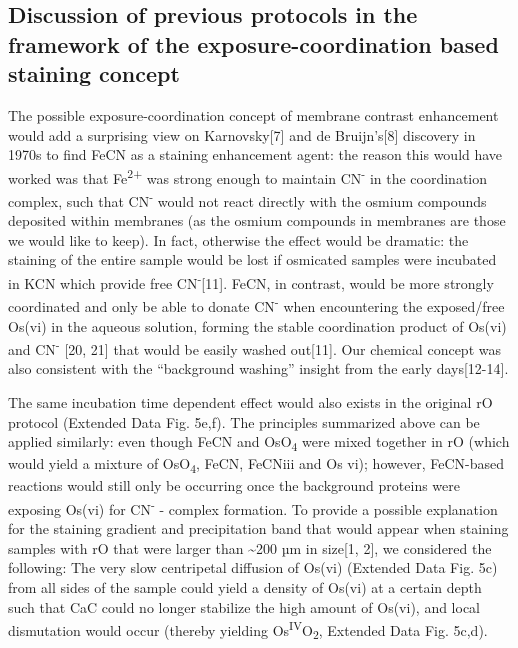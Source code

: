 \documentclass{article}
\begin{document}
\subsection*{Discussion of previous protocols in the framework of the exposure-coordination based staining concept}


The possible exposure-coordination concept of membrane contrast enhancement would add a surprising view on Karnovsky[7] and de Bruijn’s[8] discovery in 1970s to find FeCN as a staining enhancement agent: the reason this would have worked was that Fe\textsuperscript{2+} was strong enough to maintain CN\textsuperscript{-} in the coordination complex, such that CN\textsuperscript{-} would not react directly with the osmium compounds deposited within membranes (as the osmium compounds in membranes are those we would like to keep). In fact, otherwise the effect would be dramatic: the staining of the entire sample would be lost if osmicated samples were incubated in KCN which provide free CN\textsuperscript{-}[11]. FeCN, in contrast, would be more strongly coordinated and only be able to donate CN\textsuperscript{-} when encountering the exposed/free Os(vi) in the aqueous solution, forming the stable coordination product of Os(vi) and CN\textsuperscript{- } [20, 21] that would be easily washed out[11]. Our chemical concept was also consistent with the “background washing” insight from the early days[12-14]. 

The same incubation time dependent effect would also exists in the original rO protocol (Extended Data Fig. 5e,f). The principles summarized above can be applied similarly: even though FeCN and OsO\textsubscript{4} were mixed together in rO (which would yield a mixture of OsO\textsubscript{4}, FeCN, FeCNiii and Os vi); however, FeCN-based reactions would still only be occurring once the background proteins were exposing Os(vi) for CN\textsuperscript{-} - complex formation. To provide a possible explanation for the staining gradient and precipitation band that would appear when staining samples with rO that were larger than \textasciitilde{}200 µm in size[1, 2], we considered the following: The very slow centripetal diffusion of Os(vi) (Extended Data Fig. 5c) from all sides of the sample could yield a density of Os(vi) at a certain depth such that  CaC could no longer stabilize the high amount of Os(vi), and local dismutation would occur (thereby yielding Os\textsuperscript{IV}O\textsubscript{2}, Extended Data Fig.  5c,d).  
\end{document}
